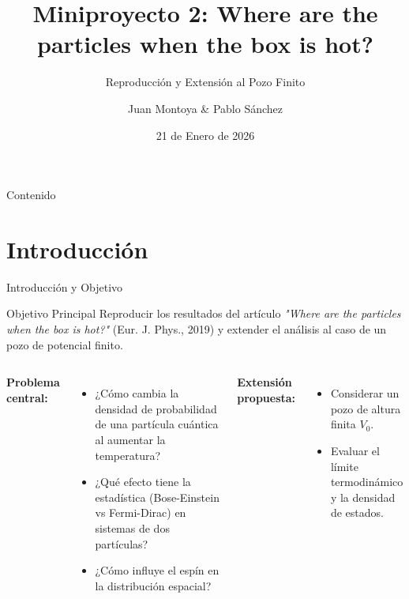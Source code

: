\documentclass[aspectratio=169]{beamer}
\title[Partículas en una Caja Caliente]{Miniproyecto 2: Where are the particles when the box is hot?}
\subtitle{Reproducción y Extensión al Pozo Finito}
\author[Juan Montoya \& Pablo Sánchez]{Juan Montoya \& Pablo Sánchez}
\institute[UdeA]{Instituto de Física\\Universidad de Antioquia}
\date{21 de Enero de 2026}
\begin{document}
\begin{frame}
\titlepage
\end{frame}

\begin{frame}{Contenido}
\tableofcontents
\end{frame}

\section{Introducción}
\begin{frame}{Introducción y Objetivo}
\begin{block}{Objetivo Principal}
Reproducir los resultados del artículo \textit{"Where are the particles when the box is hot?"} (Eur. J. Phys., 2019) y extender el análisis al caso de un pozo de potencial finito.
\end{block}

\vspace{0.2cm}
\begin{columns}[T]
\textbf{Problema central:}
\begin{itemize}
\item ¿Cómo cambia la densidad de probabilidad de una partícula cuántica al aumentar la temperatura?
\item ¿Qué efecto tiene la estadística (Bose-Einstein vs Fermi-Dirac) en sistemas de dos partículas?
\item ¿Cómo influye el espín en la distribución espacial?
\end{itemize}

\textbf{Extensión propuesta:}
\begin{itemize}
\item Considerar un pozo de altura finita $V_0$.
\item Evaluar el límite termodinámico y la densidad de estados.
\end{itemize}
\end{columns}
\end{frame}
\end{document}
